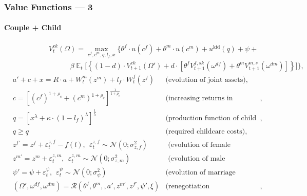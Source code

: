\documentclass{beamer}
\DeclareMathOperator{\E}{\mathbb{E}}
\begin{document}
\begin{frame}[label=value-functions]
\frametitle{Value Functions --- 3}
\framesubtitle{Couple + Child}
\hspace{-2em}
{\scriptsize
\begin{align}& \hspace{5em}  V^{ck}_t(\Omega) = \max\limits_{c^f,c^m,q,l_f,x}  \bigg\{ \theta^f\cdot u(c^f) + \theta^m \cdot u(c^m) + u^{\text{kid}}(q) +  \psi + \nonumber \\  \nonumber
 & \hspace{8em} \beta \E_t \Big[   \left\{ (1-d)\cdot   V^{ck}_{t+1}(\Omega') + d\cdot [ \theta^f V_{t+1}^{f,sk}(\omega^{df}) + \theta^m V_{t+1}^{m,s}(\omega^{dm})]\right\} \Big] \bigg\},
\end{align}\vspace{-2em}
\begin{align*}
 & a' + c + x = R\cdot a  + W^m_t(z^m) + l_f \cdot W^f_t(z^f) & \text{(evolution of joint assets)},\\
                    & c = [(c^f)^{1+\rho_c} + (c^m)^{1+\rho_c}]^{\frac1{1+\rho_c}} & \text{(increasing returns in consumption)},\\
                    & q = [ x^{\lambda} + \kappa \cdot (1-l_f)^{\lambda} ]^{\frac1{\lambda}}  & \text{(production function of child quality)},\\
                    & q \geq \underline{q} & \text{(required childcare costs)},\\
                    &  z^{f\prime} = z^f + \varepsilon^{z,f}_t - f(l), \ \ \varepsilon^{z,f}_t \sim \mathcal{N}(0;\sigma_{z,f}^2) &  \text{ (evolution of female productivity)}\\
				 &  z^{m\prime} = z^m + \varepsilon^{z,m}_t, \ \ \varepsilon^{z,m}_t \sim \mathcal{N}(0;\sigma_{z,m}^2) &  \text{ (evolution of male productivity)}\\
                    & \psi' = \psi + \varepsilon^{\psi}_t, \ \ \varepsilon^{\psi}_t \sim \mathcal{N}(0;\sigma_{\psi}^2)  & \text{(evolution of marriage surplus),} \\
                    & (\Omega',\omega^{df},\omega^{dm}) = \mathcal{R}(\theta^f,\theta^m,,a',z^{m\prime},z^{f\prime},\psi',\xi) & \text{(renegotiation correspondence)},
\end{align*}
}
\hyperlink{utilities}{}
\end{frame}
\end{document}
